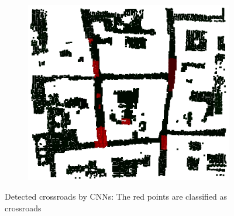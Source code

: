 \documentclass[11pt]{article}
\begin{document}
    \begin{figure}
    \centering
    \begin{subfigure}{0.45\textwidth}
        \includegraphics[width=\textwidth,keepaspectratio]{images/experiment/res_deep}
    \end{subfigure}
    \caption{Detected crossroads by CNNs: The red points are classified as crossroads}
    \label{fig:res_deep}
    \end{figure}
\end{document}
